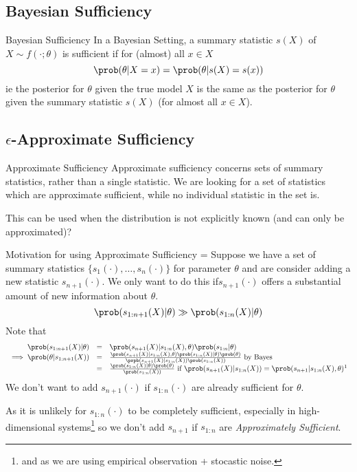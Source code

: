 \documentclass[11pt,a4paper]{article}
\begin{document}
\subsection{Bayesian Sufficiency}

  \begin{definition}{Bayesian Sufficiency\cite{wiki:Sufficient_statistic}}
    In a Bayesian Setting, a summary statistic $s(X)$ of $X\sim f(\cdot;\theta)$ is sufficient if for (almost) all $x\in X$
    \[ \prob(\theta|X=x)=\prob(\theta|s(X)=s(x)) \]
    ie the posterior for $\theta$ given the true model $X$ is the same as the posterior for $\theta$ given the summary statistic $s(X)$ (for almost all $x\in X$).
  \end{definition}

\subsection{$\epsilon$-Approximate Sufficiency}

  \begin{remark}{Approximate Sufficiency}
    Approximate sufficiency concerns sets of summary statistics, rather than a single statistic. We are looking for a set of statistics which are approximate sufficient, while no individual statistic in the set is.
    \par This can be used when the distribution is not explicitly known (and can only be approximated)?
  \end{remark}

  \begin{remark}{Motivation for using Approximate Sufficiency}
    \everymath={\displaystyle}
    Suppose we have a set of summary statistics $\{s_1(\cdot),\dots,s_n(\cdot)\}$ for parameter $\theta$ and are consider adding a new statistic $s_{n+1}(\cdot)$. We only want to do this if$s_{n+1}(\cdot)$ offers a substantial amount of new information about $\theta$.
    \[ \prob(s_{1:n+1}(X)|\theta)\gg\prob(s_{1:n}(X)|\theta) \]
    Note that
    \[\begin{array}{rcl}
      \prob(s_{1:n+1}(X)|\theta)&=&\prob(s_{n+1}(X)|s_{1:n}(X),\theta)\prob(s_{1:n}|\theta)\\
      \implies\prob(\theta|s_{1:n+1}(X))&=&\frac{\prob(s_{n+1}(X)|s_{1:n}(X),\theta)\prob(s_{1:n}(X)|\theta)\prob(\theta)}{\prpb(s_{n+1}(X)|s_{1:n}(X))\prob(s_{1:n}(X))}\text{ by Bayes}\\
      &=&\frac{\prob(s_{1:n}(X)|\theta)\prob(\theta)}{\prob(s_{1:n}(X))}\text{ if }\prob(s_{n+1}(X)|s_{1:n}(X))=\prob(s_{n+1}|s_{1:n}(X),\theta)\footnotemark
    \end{array}\]
    We don't want to add $s_{n+1}(\cdot)$ if $s_{1:n}(\cdot)$ are already sufficient for $\theta$.
    \par As it is unlikely for $s_{1:n}(\cdot)$ to be completely sufficient, especially in high-dimensional systems\footnote{and as we are using empirical observation + stocastic noise.} so we don't add $s_{n+1}$ if $s_{1:n}$ are \textit{Approximately Sufficient}.
  \end{remark}
\end{document}
